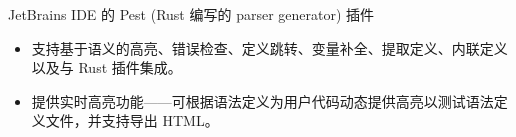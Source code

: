 \documentclass{resume}
\begin{document}


JetBrains IDE 的 Pest (Rust 编写的 parser generator) 插件
\begin{itemize}
  \item 支持基于语义的高亮、错误检查、定义跳转、变量补全、提取定义、内联定义以及与 Rust 插件集成。
  \item 提供实时高亮功能——可根据语法定义为用户代码动态提供高亮以测试语法定义文件，并支持导出 HTML。
\end{itemize}


\end{document}
